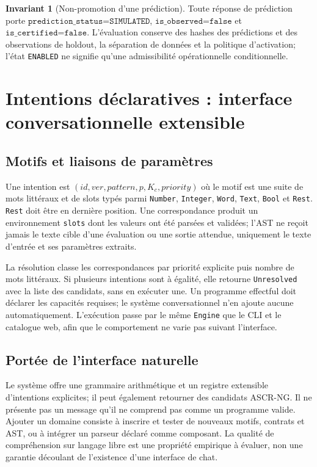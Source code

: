 \documentclass[11pt,a4paper,openany]{book}
\newcommand{\code}[1]{\texttt{#1}}
\theoremstyle{definition}
\newtheorem{invariant}[definition]{Invariant}
\theoremstyle{plain}
\theoremstyle{remark}
\begin{document}
\begin{invariant}[Non-promotion d'une prédiction]
Toute réponse de prédiction porte $\texttt{prediction\_status=SIMULATED}$, $\texttt{is\_observed=false}$ et $\texttt{is\_certified=false}$. L'évaluation conserve des hashes des prédictions et des observations de holdout, la séparation de données et la politique d'activation; l'état \code{ENABLED} ne signifie qu'une admissibilité opérationnelle conditionnelle.
\end{invariant}

\chapter{Intentions déclaratives : interface conversationnelle extensible}
\section{Motifs et liaisons de paramètres}
Une intention est $(id,ver,pattern,p,K_c,priority)$ où le motif est une suite de mots littéraux et de slots typés parmi \code{Number}, \code{Integer}, \code{Word}, \code{Text}, \code{Bool} et \code{Rest}. \code{Rest} doit être en dernière position. Une correspondance produit un environnement \code{slots} dont les valeurs ont été parsées et validées; l'AST ne reçoit jamais le texte cible d'une évaluation ou une sortie attendue, uniquement le texte d'entrée et ses paramètres extraits.

La résolution classe les correspondances par priorité explicite puis nombre de mots littéraux. Si plusieurs intentions sont à égalité, elle retourne \code{Unresolved} avec la liste des candidats, sans en exécuter une. Un programme effectful doit déclarer les capacités requises; le système conversationnel n'en ajoute aucune automatiquement. L'exécution passe par le même \code{Engine} que le CLI et le catalogue web, afin que le comportement ne varie pas suivant l'interface.

\section{Portée de l'interface naturelle}
Le système offre une grammaire arithmétique et un registre extensible d'intentions explicites; il peut également retourner des candidats ASCR-NG. Il ne présente pas un message qu'il ne comprend pas comme un programme valide. Ajouter un domaine consiste à inscrire et tester de nouveaux motifs, contrats et AST, ou à intégrer un parseur déclaré comme composant. La qualité de compréhension sur langage libre est une propriété empirique à évaluer, non une garantie découlant de l'existence d'une interface de chat.
\end{document}
